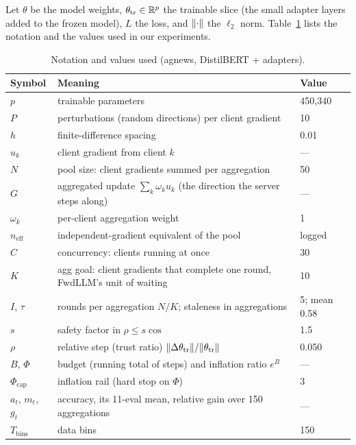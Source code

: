 Let $\theta$ be the model weights, $\theta_{\mathrm{tr}}\in\mathbb{R}^p$ the trainable slice (the small adapter layers added to the frozen model), $L$ the loss, and $\lVert \cdot\rVert$ the $\ell_2$ norm.
Table~\ref{tab:ft:notation} lists the notation and the values used in our experiments.

\begin{table}[t]
\centering
\caption{Notation and values used (agnews, DistilBERT + adapters).}
\label{tab:ft:notation}
\small
\begin{tabular}{@{}lll@{}}
\toprule
Symbol & Meaning & Value \\
\midrule
$p$ & trainable parameters & 450{,}340 \\
$P$ & perturbations (random directions) per client gradient & 10 \\
$h$ & finite-difference spacing & 0.01 \\
$u_k$ & client gradient from client $k$ & --- \\
$N$ & pool size: client gradients summed per aggregation & 50 \\
$G$ & aggregated update $\sum_k\omega_ku_k$ (the direction the server steps along) & --- \\
$\omega_k$ & per-client aggregation weight & 1 \\
$n_{\mathrm{eff}}$ & independent-gradient equivalent of the pool & logged \\
$C$ & concurrency: clients running at once & 30 \\
$K$ & agg goal: client gradients that complete one round, FwdLLM's unit of waiting & 10 \\
$I$, $\tau$ & rounds per aggregation $N/K$; staleness in aggregations & 5; mean 0.58 \\
$s$ & safety factor in $\rho\le s\cos$ & 1.5 \\
$\rho$ & relative step (trust ratio) $\lVert \Delta\theta_{\mathrm{tr}}\rVert/\lVert \theta_{\mathrm{tr}}\rVert$ & 0.050 \\
$B$, $\Phi$ & budget (running total of steps) and inflation ratio $e^B$ & --- \\
$\Phi_{\mathrm{cap}}$ & inflation rail (hard stop on $\Phi$) & 3 \\
$a_t$, $m_t$, $g_t$ & accuracy, its 11-eval mean, relative gain over 150 aggregations & --- \\
$T_{\mathrm{bins}}$ & data bins & 150 \\
\bottomrule
\end{tabular}
\end{table}


